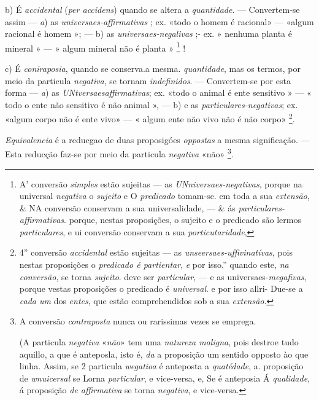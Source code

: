 b) É \emph{accidental} (\emph{per accidens}) quando se altera a \emph{quantidade}. --- Convertem-se assim --- \emph{a}) as \emph{universaes-affirmativas} ; ex. «todo o homem é racional» --- «algum racional é homem »; --- b) as \emph{universaes-negalivas} ;- ex. » nenhuma planta é mineral » --- » algum mineral não é planta » \footnote{A' conversão \emph{simples} estão sujeitas --- as \emph{UNniversaes-negativas}, porque na universal \emph{negativa} o \emph{sujeito} e O \emph{predicado} tomam-se. em toda a sua \emph{extensão}, \& NA conversão conservam a sua universalidade, --- \& ás \emph{particulares-affirmativas}. porque, nestas proposições, o sujeito e o predicado são lermos \emph{particulares}, e ui conversão conservam a sua \emph{porticutaridade},} !

c) É \emph{coniraposia}, quando se conserva.a mesma. \emph{quantidade}, mas os termos, por meio da particula \emph{negativa}, se tornam \emph{indefinidos}. --- Convertem-se por esta forma --- \emph{a}) as \emph{UNtversaesaffirmativas}; ex. «todo o animal é ente sensitivo » --- « todo o ente não sensitivo é não animal », --- b) e as \emph{particulares-negativas}; ex. «algum corpo não é ente vivo» --- « algum ente não vivo não é não corpo» \footnote{4” conversão \emph{accidental} estão sujeitas --- as \emph{unseersaes-uffivinatívas}, pois nestas proposições o \emph{predicado é partientar}, \emph{e} por isso.” quando este, \emph{na conversão}, se torna \emph{sujeito}. deve ser \emph{particular}, --- e as universaes-\emph{megafivas}, porque vestas proposições o predicado é \emph{universal}. e por isso allri- Due-se a \emph{cada um} dos \emph{entes}, que estão comprehendidos sob a sua \emph{extensão}.}.


\emph{Equivalencia} é a reducgao de duas proposigóes \emph{oppostas} a mesma significação. --- Esta reducção faz-se por meio da particula \emph{negativa} «não» \footnote{A conversão \emph{contraposta} nunca ou rarissimas vezes se emprega.\par (A particula \emph{negativa} «\emph{não}» tem uma \emph{natureza maligna}, pois destroe tudo aquillo, a que é anteposla, isto é, \emph{da} a proposição um sentido opposto ào que linha. Assim, se 2 particula \emph{wegatioa} é anteposta a \emph{quatédade}, a. proposição de \emph{wnuicersal} se Lorna \emph{particular}, e vice-versa, e, Se é anteposia Á \emph{qualidade}, á proposição \emph{de affirmativa} se torna \emph{negativa}, e vice-versa.}.

